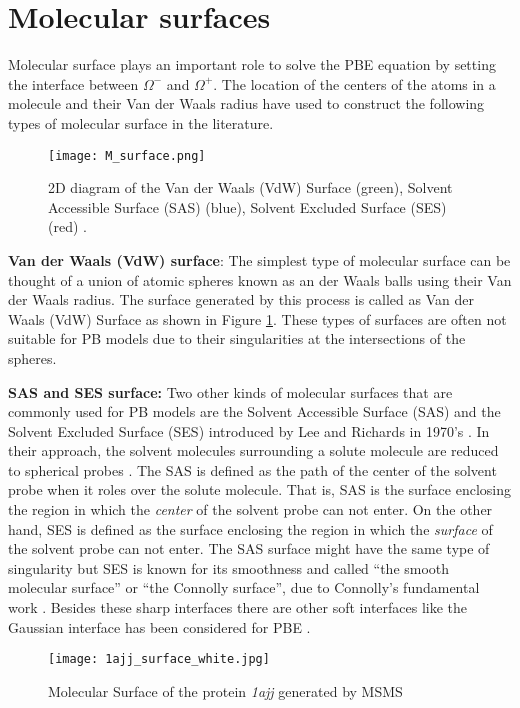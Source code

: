 \section{Molecular surfaces}
\label{sec:m_srface}
Molecular surface plays an important role to solve the PBE equation by setting the interface between $\Omega^-$ and $\Omega^+$. The location of the centers of the atoms in a molecule and their Van der Waals radius have used to construct the following types of molecular surface in the literature.  
\begin{figure}[!ht]
	\begin{center}
		\texttt{[image: M\_surface.png]}
	\end{center}
	\caption{2D diagram of the Van der Waals (VdW) Surface (green), Solvent Accessible Surface
(SAS) (blue), Solvent Excluded Surface (SES) (red) \cite{Quan2018}.}
\label{fig:M_surface}
\end{figure}

{\bf Van der Waals (VdW) surface}: The simplest type of molecular surface can be thought of a union of atomic spheres known as an der Waals balls using their Van der Waals radius. The surface generated by this process is called as Van der Waals (VdW) Surface as shown in Figure \ref{fig:M_surface}. These types of surfaces are often not suitable for PB models due to their singularities at the intersections of the spheres.  

{\bf SAS and SES surface:} Two other kinds of molecular surfaces that are commonly used for PB models are the Solvent Accessible Surface (SAS) and the Solvent Excluded Surface (SES) introduced by Lee and Richards in 1970's \cite{LEE1971379,Fred1977}. In their approach, the solvent molecules surrounding a solute molecule are reduced to spherical probes \cite{Tomasi2005}. The SAS is defined as the path of the center of the solvent probe when it roles over the solute molecule. That is, SAS is the surface enclosing the region in which the {\it center} of the solvent probe can not enter. On the other hand, SES is defined as the surface enclosing the region in which the {\it surface} of the solvent probe can not enter. The SAS surface might have the same type of singularity but SES is known for its smoothness and called “the smooth molecular surface” or “the Connolly surface”, due to Connolly’s fundamental work \cite{Connolly1983}. Besides these sharp interfaces there are other soft interfaces like the Gaussian interface has been considered for PBE \cite{Hazra2019}.   
\begin{figure}[!ht]
	\centering
	\texttt{[image: 1ajj\_surface\_white.jpg]}	
	\caption{Molecular Surface of the protein \textit{1ajj} generated by MSMS}
	\label{fig:1ajj_surface}
\end{figure}

